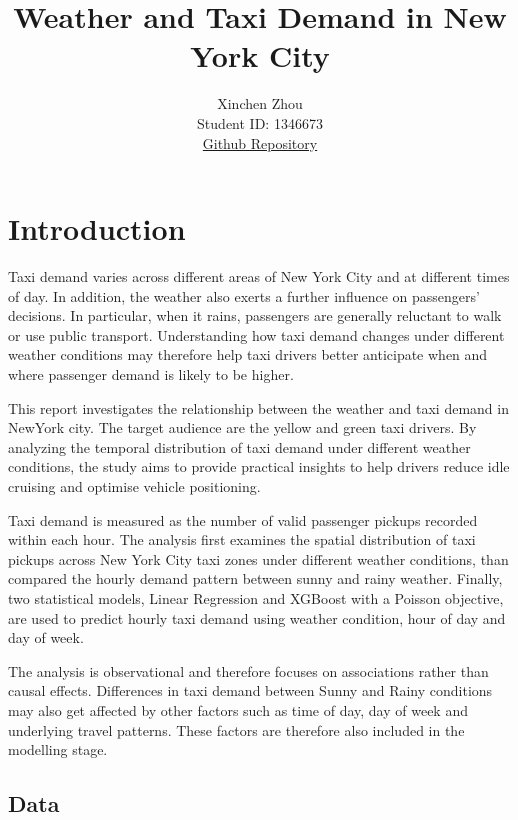 \documentclass[11pt]{article}
\title{\textbf{Weather and Taxi Demand in New York City}}
\author{
Xinchen Zhou \\
Student ID: 1346673 \\
\href{https://github.com/bibobibobibobibo224/MAST30034-Project_1}{Github Repository}
}
\begin{document}
\maketitle



\section{Introduction}

Taxi demand varies across different areas of New York City and at different times of day. In addition, the weather also exerts a further influence on passengers’ decisions. In particular, when it rains, passengers are generally reluctant to walk or use public transport. Understanding how taxi demand changes under different weather conditions may therefore help taxi drivers better anticipate when and where passenger demand is likely to be higher.

This report investigates the relationship between the weather and taxi demand in NewYork city. The target audience are the yellow and green taxi drivers. By analyzing the temporal distribution of taxi demand under different weather conditions, the study aims to provide practical insights to help drivers reduce idle cruising and optimise vehicle positioning.

Taxi demand is measured as the number of valid passenger pickups recorded within each hour. The analysis first examines the spatial distribution of taxi pickups across New York City taxi zones under different weather conditions, than compared the hourly demand pattern between sunny and rainy weather. Finally, two statistical models, Linear Regression and XGBoost with a Poisson objective, are used to predict hourly taxi demand using weather condition, hour of day and day of week.

The analysis is observational and therefore focuses on associations rather than causal effects. 
Differences in taxi demand between Sunny and Rainy conditions may also get affected by other factors such as time of day, day of week and underlying travel patterns. These factors are therefore 
also included in the modelling stage.


\subsection{Data}
\end{document}
